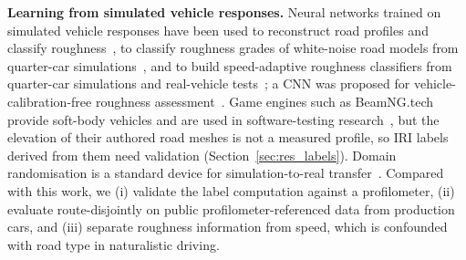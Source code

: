 \textbf{Learning from simulated vehicle responses.}
Neural networks trained on simulated vehicle responses have been used to reconstruct road profiles and classify roughness~\cite{ngwangwa2010ann}, to classify roughness grades of white-noise road models from quarter-car simulations~\cite{rcnn2023sim}, and to build speed-adaptive roughness classifiers from quarter-car simulations and real-vehicle tests~\cite{speedadaptive2025}; a CNN was proposed for vehicle-calibration-free roughness assessment~\cite{jeong2020cnn}.
Game engines such as BeamNG.tech provide soft-body vehicles and are used in software-testing research~\cite{gambi2019beamng,beamng}, but the elevation of their authored road meshes is not a measured profile, so IRI labels derived from them need validation (Section~\ref{sec:res_labels}).
Domain randomisation is a standard device for simulation-to-real transfer~\cite{tobin2017dr}.
Compared with this work, we (i) validate the label computation against a profilometer, (ii) evaluate route-disjointly on public profilometer-referenced data from production cars, and (iii) separate roughness information from speed, which is confounded with road type in naturalistic driving.
